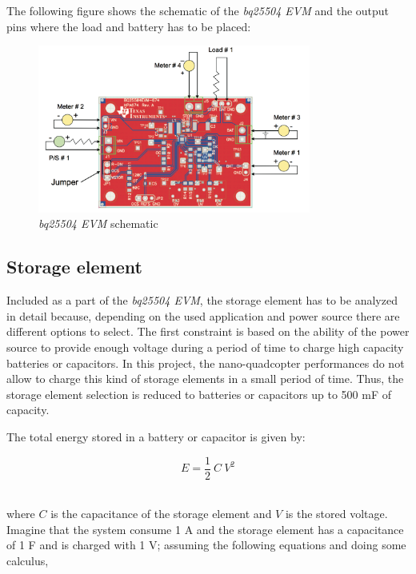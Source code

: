 The following figure shows the schematic of the \textit{bq25504 EVM} and the output pins where the load and battery has to be placed:

\begin{figure}[H]
\begin{center}
\includegraphics[width=0.8\textwidth]{./images/bq25504}
\caption{\textit{bq25504 EVM} schematic}
\end{center}
\end{figure}


\subsection{Storage element}

Included as a part of the \textit{bq25504 EVM}, the storage element has to be analyzed in detail because, depending on the used application and power source there are different options to select. The first constraint is based on the ability of the power source to provide enough voltage during a period of time to charge high capacity batteries or capacitors. In this project, the nano-quadcopter performances do not allow to charge this kind of storage elements in a small period of time. Thus, the storage element selection is reduced to batteries or capacitors up to 500 mF of capacity. 

The total energy stored in a battery or capacitor is given by:

\begin{equation}
E = \frac{1}{2}\:C\:V^2
\end{equation}    

where $C$ is the capacitance of the storage element and $V$ is the stored voltage. Imagine that the system consume 1 A and the storage element has a capacitance of 1 F and is charged with 1 V; assuming the following equations and doing some calculus,

